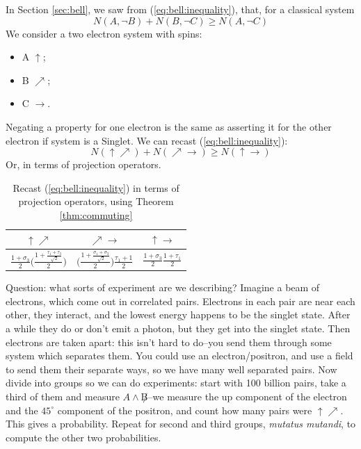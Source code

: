 \documentclass[]{article}
\begin{document}
In Section \ref{sec:bell}, we saw from (\ref{eq:bell:inequality}), that, for a classical system $$N(A, \neg B) + N(B, \neg C) \ge N(A,\neg C)$$
We consider a two electron system with spins:
\begin{itemize}
	\item A $\uparrow$;
	\item B $\nearrow$;
	\item C $\rightarrow$.
\end{itemize}
Negating a property for one electron is the same as asserting it for the other electron if system is a Singlet. We can recast (\ref{eq:bell:inequality}):
$$N(\uparrow \nearrow) + N(\nearrow \rightarrow) \ge N(\uparrow\rightarrow)$$
Or, in terms of projection operators.
\begin{table}[H]
	\begin{center}
		\caption{Recast (\ref{eq:bell:inequality}) in terms of projection operators, using Theorem \ref{thm:commuting}}
		\begin{tabular}{|c|c|c|} \hline
			$\uparrow\nearrow$&$\nearrow\rightarrow$&$\uparrow\rightarrow$ \\ \hline
			$\frac{1+\sigma_3}{2} \Big(\frac{1+\frac{\tau_1+\tau_3}{\sqrt{2}}}{2}\Big)$&$\Big(\frac{1+\frac{\sigma_1+\sigma_3}{\sqrt{2}}}{2}\Big)\frac{\tau_1+1}{2}$&$\frac{1+\sigma_3}{2} \frac{1+\tau_1}{2}$ \\ \hline
		\end{tabular}
	\end{center}
\end{table}

Question: what sorts of experiment are we describing? Imagine a beam of electrons, which come out in correlated pairs. Electrons in each pair are near each other, they interact, and the lowest energy happens to be the singlet state. After a while they do or don't emit a photon, but they get into the singlet state. Then electrons are taken apart: this isn't hard to do--you send them through some system which separates them. You could use an electron/positron, and use a field to send them their separate ways, so we have many well separated pairs. Now divide into groups so we can do experiments: start with 100 billion pairs, take a third of them and measure $A\land\not B$--we measure the up component of the electron and the $45^{\circ}$ component of the positron, and count how many pairs were $\uparrow\nearrow$. This gives a probability. Repeat for second and third groups, \emph{mutatus mutandi}, to compute the other two probabilities.
\end{document}
